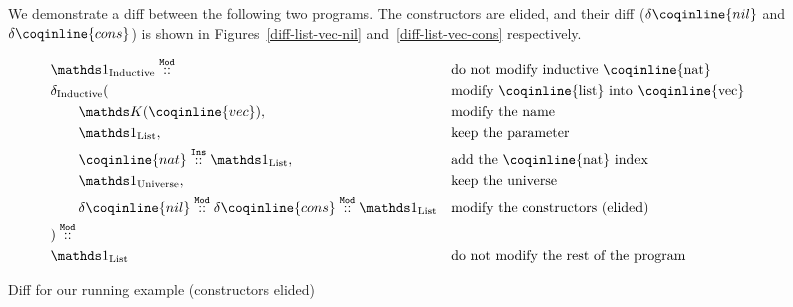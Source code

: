 \begin{figure*}[!htp]

  \centering

  We demonstrate a diff between the following two programs.  The constructors
are elided, and their diff ($\delta\coqinline{nil}$ and
$\delta\coqinline{cons}$) is shown in Figures~\ref{diff-list-vec-nil}
and~\ref{diff-list-vec-cons} respectively.

\noindent%
\cprotect{}%
\cprotect{}

  \vspace{2em}%

  \begin{align*}
&\MathSameInductive{} \MathMod{}{} && \text{do not modify inductive \coqinline{nat}}\\
& \deltaInductive{} ( && \text{modify \coqinline{list} into \coqinline{vec}} \\
& \qquad \MathReplace{\coqinline{vec}}, && \text{modify the name} \\
& \qquad \MathSameList{},       && \text{keep the parameter} \\
& \qquad \MathIns{\coqinline{nat}}{\MathSameList{}}, && \text{add the \coqinline{nat} index} \\
& \qquad \MathSameUniverse{}, && \text{keep the universe} \\
& \qquad \MathMod{\delta\coqinline{nil}}{\MathMod{\delta\coqinline{cons}}{\MathSameList{}}}
  && \text{modify the constructors (elided)} \\
& ) \MathMod{}{} && \\
& \MathSameList{} && \text{do not modify the rest of the program}
  \end{align*}

  \caption{Diff for our running example (constructors elided)}
  \label{diff-list-vec}

\end{figure*}

